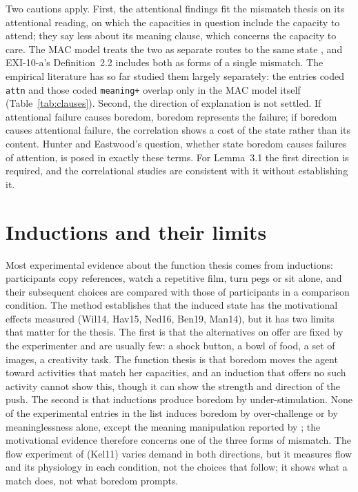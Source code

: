 \documentclass{situationist-preprint}
\begin{document}
Two cautions apply. First, the attentional findings fit the mismatch thesis on its attentional reading, on which the capacities in question include the capacity to attend; they say less about its meaning clause, which concerns the capacity to care. The MAC model treats the two as separate routes to the same state \citep{WestgateWilson2018}, and EXI-10-a's Definition~2.2 includes both as forms of a single mismatch. The empirical literature has so far studied them largely separately: the entries coded \texttt{attn} and those coded \texttt{meaning+} overlap only in the MAC model itself (Table~\ref{tab:clauses}). Second, the direction of explanation is not settled. If attentional failure causes boredom, boredom represents the failure; if boredom causes attentional failure, the correlation shows a cost of the state rather than its content. Hunter and Eastwood's question, whether state boredom causes failures of attention, is posed in exactly these terms. For Lemma~3.1 the first direction is required, and the correlational studies are consistent with it without establishing it.

\section{Inductions and their limits}\label{s:induction}

Most experimental evidence about the function thesis comes from inductions: participants copy references, watch a repetitive film, turn pegs or sit alone, and their subsequent choices are compared with those of participants in a comparison condition. The method establishes that the induced state has the motivational effects measured (Wil14, Hav15, Ned16, Ben19, Man14), but it has two limits that matter for the thesis. The first is that the alternatives on offer are fixed by the experimenter and are usually few: a shock button, a bowl of food, a set of images, a creativity task. The function thesis is that boredom moves the agent toward activities that match her capacities, and an induction that offers no such activity cannot show this, though it can show the strength and direction of the push. The second is that inductions produce boredom by under-stimulation. None of the experimental entries in the list induces boredom by over-challenge or by meaninglessness alone, except the meaning manipulation reported by \citet{Fahlman2009}; the motivational evidence therefore concerns one of the three forms of mismatch. The flow experiment of \citet{Keller2011} (Kel11) varies demand in both directions, but it measures flow and its physiology in each condition, not the choices that follow; it shows what a match does, not what boredom prompts.
\end{document}
